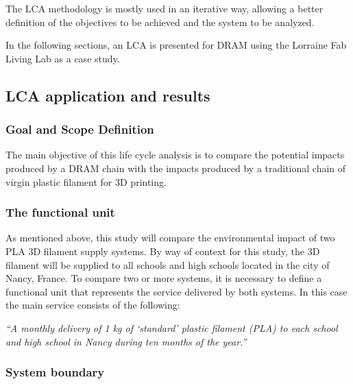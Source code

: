 \documentclass[]{elsarticle} %
\begin{document}
The LCA methodology is mostly used in an iterative way, allowing a better definition of the objectives to be achieved and the system to be analyzed.

In the following sections, an LCA is presented for DRAM using the Lorraine Fab Living Lab as a case study.

\hypertarget{lca-application-and-results}{%
\subsection{LCA application and results}\label{lca-application-and-results}}

\hypertarget{goal-and-scope-definition}{%
\subsubsection{Goal and Scope Definition}\label{goal-and-scope-definition}}

The main objective of this life cycle analysis is to compare the potential impacts produced by a DRAM chain with the impacts produced by a traditional chain of virgin plastic filament for 3D printing.

\hypertarget{the-functional-unit}{%
\subsubsection{The functional unit}\label{the-functional-unit}}

As mentioned above, this study will compare the environmental impact of two PLA 3D filament supply systems. By way of context for this study, the 3D filament will be supplied to all schools and high schools located in the city of Nancy, France. To compare two or more systems, it is necessary to define a functional unit that represents the service delivered by both systems. In this case the main service consists of the following:

\emph{``A monthly delivery of 1 kg of `standard' plastic filament (PLA) to each school and high school in Nancy during ten months of the year.''}

\hypertarget{system-boundary}{%
\subsubsection{System boundary}\label{system-boundary}}
\end{document}
